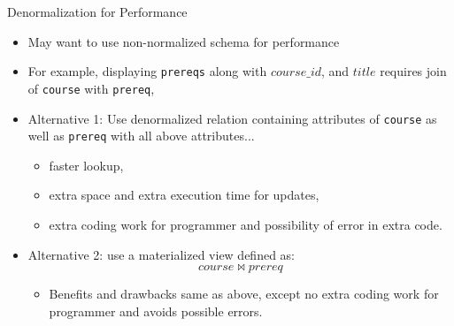 \documentclass[aspectratio=169]{beamer}
\begin{document}
\begin{frame}{Denormalization for Performance}
    \begin{itemize}
        \item May want to use non-normalized schema for performance
        \item For example, displaying \texttt{prereqs} along with $course\_id$, and $title$ requires join of \texttt{course} with \texttt{prereq},
        \item Alternative 1: Use denormalized relation containing attributes of \texttt{course} as well as \texttt{prereq} with all above attributes...
            \begin{itemize}
                \item faster lookup,
                \item extra space and extra execution time for updates,
                \item extra coding work for programmer and possibility of error in extra code.
            \end{itemize}
        \item Alternative 2: use a materialized view defined as:
            $$
                course \Join prereq
            $$
            \vspace{-5mm}
            \begin{itemize}
                \item Benefits and drawbacks same as above, except no extra coding work for programmer and avoids possible errors.
            \end{itemize}
    \end{itemize}
\end{frame}
\end{document}

